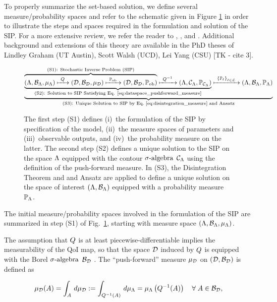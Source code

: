 To properly summarize the set-based solution, we define several measure/probability spaces and refer to the schematic given in Figure \ref{fig:scheme} in order to illustrate the steps and spaces required in the formulation and solution of the SIP.
For a more extensive review, we refer the reader to \cite{BBE11}, \cite{BES12}, and \cite{BET+14}.
Additional background and extensions of this theory are available in the PhD theses of Lindley Graham (UT Austin), Scott Walsh (UCD), Lei Yang (CSU) [TK - cite 3].

\begin{figure}[!h]
\begin{equation}
\underbrace{
\underbrace{
\overbrace{
 ({\Lambda}, \mathcal{B}_{{\Lambda}}, \mu_{{\Lambda}}) \xmapsto{\  Q\ } (\mathcal{D}, \mathcal{B}_{\mathcal{D}}, \mu_{\mathcal{D}})
  \xmapsto{\ \operatorname*{\mathbb{P}_{ob}}\ } (\mathcal{D}, \mathcal{B}_{\mathcal{D}}, \operatorname*{\mathbb{P}_{ob}})
 }^{
 \text{(S1): Stochastic Inverse Problem (SIP)}
 }
 \xmapsto{\ Q^{-1} \ } ({\Lambda}, \mathcal{C}_{{\Lambda}}, \operatorname*{\mathbb{P}_{\mathcal{C}_{{\Lambda}}}})
 }_{
 \text{(S2): Solution to SIP Satisfying Eq. \eqref{eq:dataspace_pushforward_measure}}}
 \xmapsto{\ \left\{\mathbb{P}_\ell\right\}_{\ell\in\mathcal{L}} \ } ({\Lambda}, \mathcal{B}_{{\Lambda}}, \mathbb{P}_{\Lambda})
 }
 _{
 \text{(S3): Unique Solution to SIP by Eq.~\eqref{eq:disintegration_measure} and Ansatz}
 }
\end{equation}
\caption{The first step (S1) defines (i)~the formulation of the SIP by specification of the model, (ii)~the measure spaces of parameters and (iii)~observable outputs, and (iv)~the probability measure on the latter. The second step (S2) defines a unique solution to the SIP on the space ${\Lambda}$ equipped with the contour $\sigma\text{-algebra}$ $\mathcal{C}_{{\Lambda}}$ using the definition of the push-forward measure. In (S3), the Disintegration Theorem and and Ansatz are applied to define a unique solution on the space of interest $({\Lambda}, \mathcal{B}_{{\Lambda}})$ equipped with a probability measure $\mathbb{P}_{\Lambda}$.}
\label{fig:scheme}
\end{figure}


The initial measure/probability spaces involved in the formulation of the SIP are summarized in step (S1) of Fig.~\ref{fig:scheme}, starting with measure space $({\Lambda}, \mathcal{B}_{{\Lambda}}, \mu_{{\Lambda}})$.

The assumption that $Q$ is at least piecewise-differentiable implies the measurability of the QoI map, so that the space $\mathcal{D}$ induced by $Q$ is equipped with the Borel $\sigma\text{-algebra}$ $\mathcal{B}_{\mathcal{D}}$ \cite{Hunter}.
The ``push-forward'' measure $\mu_{\mathcal{D}}$ on ${(\mathcal{D}, \mathcal{B}_{\mathcal{D}})}$ is defined as

\begin{equation}\label{eq:dataspace_pushforward_measure}
\mu_{\mathcal{D}} (A) = \int_A \, d\mu_{\mathcal{D}} := \int_{Q^{-1}(A)} \, d\mu_{{\Lambda}} = \mu_{{\Lambda}} \left (Q^{-1}(A) \right ) \quad \forall \;  A\in\mathcal{B}_{\mathcal{D}},
\end{equation}

